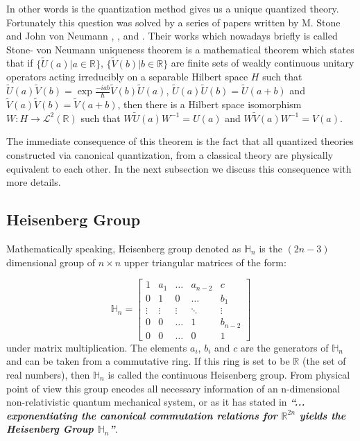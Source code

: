 \documentclass[12pt,a4paper]{article}
\begin{document}
In other words is the quantization method gives us a unique quantized theory.
 Fortunately this question was solved by a series of papers written by M. Stone and John von Neumann \cite{Stone1930}, \cite{Neumann1931},  \cite{Neumann1932} and  \cite{Stone1932}. Their works which nowadays briefly is called  Stone- von Neumann uniqueness theorem is a mathematical theorem which states that if $\{\tilde{U}(a)| a\in\mathbb{R}\}$, $\{\tilde{V}(b)| b\in\mathbb{R}\}$ are finite sets of weakly continuous unitary operators acting irreducibly on a separable Hilbert space $H$ such that $\tilde{U}(a)\tilde{V}(b)=\exp{\frac{-iab}{\hbar}}\tilde{V}(b)\tilde{U}(a)$, $\tilde{U}(a)\tilde{U}(b)=\tilde{U}(a+b)$ and $\tilde{V}(a)\tilde{V}(b)=\tilde{V}(a+b)$, then there is a Hilbert space isomorphism $W:H\rightarrow \mathcal{L}^2 (\mathbb{R})$ such that $W\tilde{U}(a)W^{-1}=U(a)$ and $W\tilde{V}(a)W^{-1}=V(a)$.

The immediate consequence of this theorem is the fact that all quantized theories constructed via canonical quantization, from a classical theory are physically equivalent to each other. In the next subsection we discuss this consequence with more details.
\subsection{Heisenberg Group}\label{H}
 Mathematically speaking, Heisenberg group denoted as $\mathbb{H}_n$ is the $(2n-3)$ dimensional group of $n\times n$ upper triangular matrices of the form:

\[
\mathbb{H}_n
=
\begin{bmatrix}
    1 & a_1 &  \dots  & a_{n-2} & c \\
    0 & 1 &0 & \dots  & b_1 \\
    \vdots & \vdots & \vdots & \ddots & \vdots \\
    0 & 0  & \dots & 1  & b_{n-2} \\
    0 & 0 &  \dots & 0 &1
\end{bmatrix}
\]
under matrix multiplication. The elements $a_i$, $b_i$ and $c$ are the generators of $\mathbb{H}_n$ and can be taken from a commutative ring. If this ring is set to be $\mathbb{R}$ (the set of real numbers), then $\mathbb{H}_n$ is called the continuous Heisenberg group. From physical point of view this group encodes all necessary information of an n-dimensional non-relativistic quantum mechanical system, or as it has stated in \cite{Laura} \emph{\textbf{``... exponentiating the canonical commutation relations for \emph{\textbf{$\mathbb{R}^{2n}$}} yields the Heisenberg Group $\mathbb{H}_n$''}}.
\end{document}
